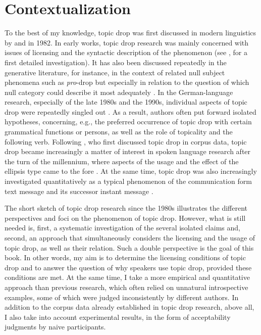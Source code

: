 \section{Contextualization}
To the best of my knowledge, topic drop was first discussed in modern linguistics by  and  in 1982.
In early works, topic drop research was mainly concerned with issues of licensing and the syntactic description of the phenomenon (see \cite{fries1988}, for a first detailed investigation).
It has also been discussed repeatedly in the generative literature, for instance, in the context of related null subject  phenomena such as \textit{pro}-drop  but especially in relation to the question of which null category could describe it most adequately \citep[e.g.,][]{huang1984, cardinaletti1990, haegeman1990, rizzi1994}.
In the German-language research, especially of the late 1980s and the 1990s, individual aspects of topic drop were repeatedly singled out \citep[e.g.,][]{sternefeld1985,oppenrieder1987, auer1993, poitou1993, zifonun.etal1997}.
As a result, authors often  put forward isolated hypotheses, concerning, e.g., the preferred occurrence of topic drop with certain grammatical functions or persons, as well as the role of topicality and the following verb.
Following \citet{auer1993}, who first discussed topic drop in corpus data, topic drop became increasingly a matter of interest in spoken language research after the turn of the millennium, where aspects of the usage and the effect of the ellipsis type came to the fore \citep[e.g.,][]{sandig2000, guenthner2000, guenthner2006, schwitalla2012, imo2013, imo2014, helmer2016}.
At the same time, topic drop was also increasingly investigated quantitatively as a typical phenomenon of the communication form text message and its successor instant message \citep{androutsopoulos.schmidt2002,doring2002,frick2017}.

The short sketch of topic drop research since the 1980s illustrates the different perspectives and foci on the phenomenon of topic drop.
However, what is still needed is, first, a systematic investigation of the several isolated claims and, second, an approach that simultaneously considers the licensing and the usage of topic drop, as well as their relation.
Such a double perspective is the goal of this book.
In other words, my aim is to determine the licensing conditions of topic drop and to answer the question of why speakers use topic drop, provided these conditions are met.
At the same time, I take a more empirical and quantitative approach than previous research, which often relied on unnatural introspective examples, some of which were judged inconsistently by different authors.
In addition to the corpus data already established in topic drop research, above all, I also take into account experimental results, in the form of acceptability judgments by naive participants. 

